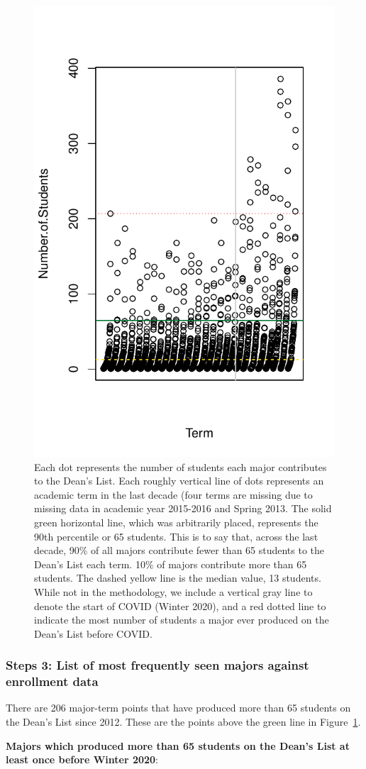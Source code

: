 \documentclass[10]{article}
\begin{document}
\begin{figure}[H]
	\centering
	\includegraphics[width=0.33\linewidth]{../visualizations/contributions-by-major2}
	\caption{Each dot represents the number of students each major contributes to the Dean's List. Each roughly vertical line of dots represents an academic term in the last decade (four terms are missing due to missing data in academic year 2015-2016 and Spring 2013. The solid green horizontal line, which was arbitrarily placed, represents the 90th percentile or 65 students. This is to say that, across the last decade, 90\% of all majors contribute fewer than 65 students to the Dean's List each term. 10\% of majors contribute more than 65 students. The dashed yellow line is the median value, 13 students. While not in the methodology, we include a vertical gray line to denote the start of COVID (Winter 2020), and a red dotted line to indicate the most number of students a major ever produced on the Dean's List before COVID. }
	\label{fig:contributions-by-major}
\end{figure}


\subsubsection{Steps 3: List of most frequently seen majors against enrollment data}

There are 206 major-term points that have produced more than 65 students  on the Dean's List since 2012. These are the points above the green line in Figure~\ref{fig:contributions-by-major}.


\textbf{Majors which produced more than 65 students on the Dean's List at least once before Winter 2020}:
\end{document}
